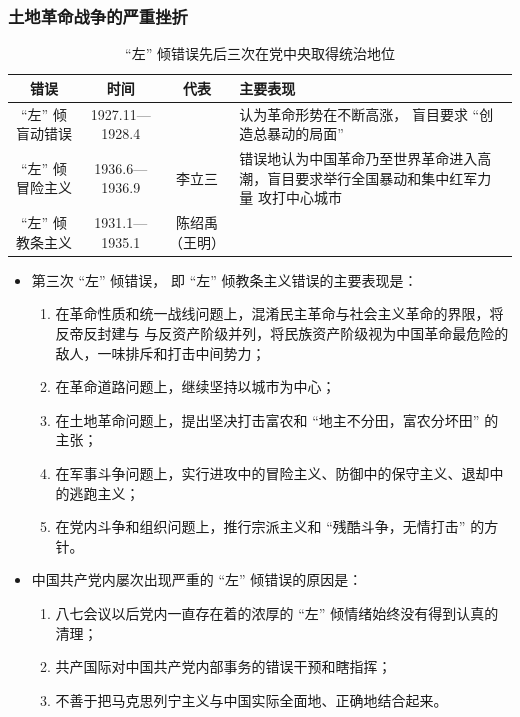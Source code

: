 \documentclass[10pt, UTF8]{book} %
\begin{document}
\subsubsection{土地革命战争的严重挫折}

\begin{table}[H]
    \centering
    \caption{“左” 倾错误先后三次在党中央取得统治地位}
    \begin{tabular}{c c c p{}}
        \hline 
        错误 & 时间 & 代表 & 主要表现 \\
        \hline 
        “左” 倾盲动错误 & 1927.11—1928.4 & & 认为革命形势在不断高涨，
        盲目要求 “创造总暴动的局面” \\ 
        “左” 倾冒险主义 & 1936.6—1936.9 & 李立三 & 
        错误地认为中国革命乃至世界革命进入高潮，盲目要求举行全国暴动和集中红军力量
        攻打中心城市 \\ 
        “左” 倾教条主义 & 1931.1—1935.1 & 陈绍禹（王明） &  \\ 
        \hline
    \end{tabular}
\end{table}

\begin{itemize}[itemsep=0pt]
    \item 第三次 “左” 倾错误， 即 “左” 倾教条主义错误的主要表现是：
    \begin{enumerate}[itemsep=0pt, label={(\arabic*)}]
        \item 在革命性质和统一战线问题上，混淆民主革命与社会主义革命的界限，将反帝反封建与
        与反资产阶级并列，将民族资产阶级视为中国革命最危险的敌人，一味排斥和打击中间势力；
        \item 在革命道路问题上，继续坚持以城市为中心；
        \item 在土地革命问题上，提出坚决打击富农和 “地主不分田，富农分坏田” 的主张；
        \item 在军事斗争问题上，实行进攻中的冒险主义、防御中的保守主义、退却中的逃跑主义；
        \item 在党内斗争和组织问题上，推行宗派主义和 “残酷斗争，无情打击” 的方针。
    \end{enumerate}
    \item 中国共产党内屡次出现严重的 “左” 倾错误的原因是：
    \begin{enumerate}[itemsep=0pt, label={(\arabic*)}]
        \item 八七会议以后党内一直存在着的浓厚的 “左” 倾情绪始终没有得到认真的清理；
        \item 共产国际对中国共产党内部事务的错误干预和瞎指挥；
        \item 不善于把马克思列宁主义与中国实际全面地、正确地结合起来。
    \end{enumerate}
\end{itemize}
\end{document}
